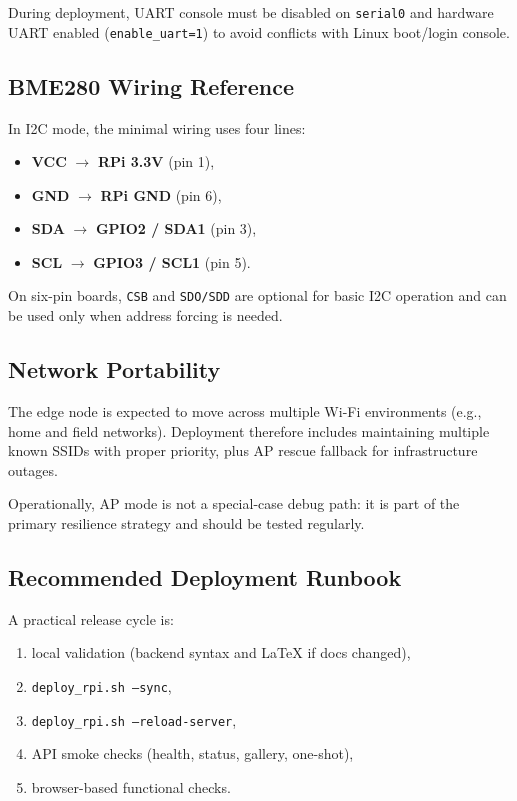 During deployment, UART console must be disabled on \texttt{serial0} and hardware UART enabled (\texttt{enable\_uart=1}) to avoid conflicts with Linux boot/login console.

\subsection{BME280 Wiring Reference}
In I2C mode, the minimal wiring uses four lines:
\begin{itemize}
  \item \textbf{VCC} $\rightarrow$ \textbf{RPi 3.3V} (pin 1),
  \item \textbf{GND} $\rightarrow$ \textbf{RPi GND} (pin 6),
  \item \textbf{SDA} $\rightarrow$ \textbf{GPIO2 / SDA1} (pin 3),
  \item \textbf{SCL} $\rightarrow$ \textbf{GPIO3 / SCL1} (pin 5).
\end{itemize}

On six-pin boards, \texttt{CSB} and \texttt{SDO/SDD} are optional for basic I2C operation and can be used only when address forcing is needed.

\subsection{Network Portability}
The edge node is expected to move across multiple Wi-Fi environments (e.g., home and field networks). Deployment therefore includes maintaining multiple known SSIDs with proper priority, plus AP rescue fallback for infrastructure outages.

Operationally, AP mode is not a special-case debug path: it is part of the primary resilience strategy and should be tested regularly.

\subsection{Recommended Deployment Runbook}
A practical release cycle is:
\begin{enumerate}
  \item local validation (backend syntax and LaTeX if docs changed),
  \item \texttt{deploy\_rpi.sh --sync},
  \item \texttt{deploy\_rpi.sh --reload-server},
  \item API smoke checks (health, status, gallery, one-shot),
  \item browser-based functional checks.
\end{enumerate}

